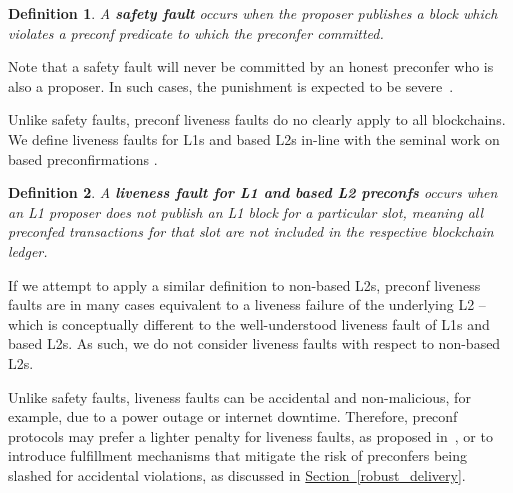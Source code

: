 \documentclass[a4paper]{article}
\theoremstyle{boldstyle}
\newtheorem{definitionx}{Definition}
\newenvironment{definition}
  {\begin{defopenboxq}\begin{definitionx}}
  {\end{definitionx}\end{defopenboxq}}
\begin{document}
        \begin{definition}
            A \textbf{safety fault} occurs when the proposer publishes a block which violates a preconf predicate to which the preconfer committed.
        \end{definition}
        
    \par
    Note that a safety fault will never be committed by an honest preconfer who is also a proposer. In such cases, the punishment is expected to be severe~\cite{W:Basedpreconfirmations}.
    
    Unlike safety faults, preconf liveness faults do no clearly apply to all blockchains. We define liveness faults for L1s and based L2s in-line with the seminal work on based preconfirmations \cite{W:Basedpreconfirmations}.
    
        \begin{definition}
            \label{def:liveness_fault}
            A \textbf{liveness fault for L1 and based L2 preconfs} occurs when an L1 proposer does not publish an L1 block for a particular slot, meaning all preconfed transactions for that slot are not included in the respective blockchain ledger.
        \end{definition}

         If we attempt to apply a similar definition to non-based L2s, preconf liveness faults are in many cases equivalent to a liveness failure of the underlying L2 -- which is conceptually different to the well-understood liveness fault of L1s and based L2s. As such, we do not consider liveness faults with respect to non-based L2s. 
         
         Unlike safety faults, liveness faults can be accidental and non-malicious, for example, due to a power outage or internet downtime. Therefore, preconf protocols may prefer a lighter penalty for liveness faults, as proposed in~\cite{W:Basedpreconfirmations}, or to introduce fulfillment mechanisms that mitigate the risk of preconfers being slashed for accidental violations, as discussed in \hyperref[robust_delivery]{Section~\ref{robust_delivery}}.     
\end{document}
